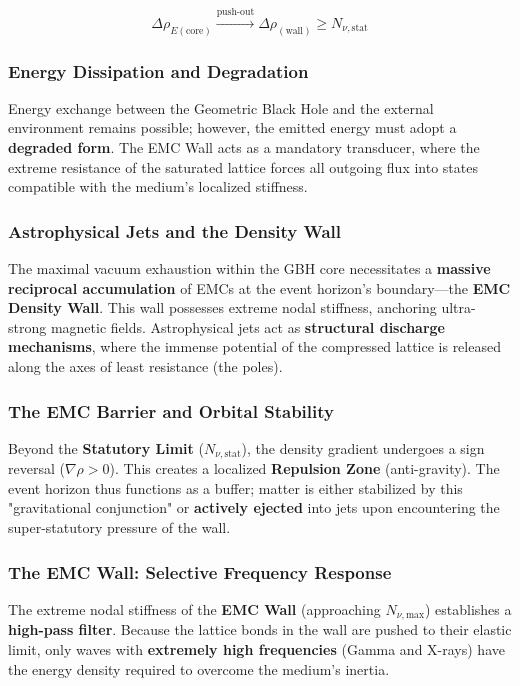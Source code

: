 \documentclass[10pt,a4paper]{article}
\begin{document}
\begin{equation}
	\Delta \rho_{E (\text{core})} \xrightarrow{\text{push-out}} \Delta \rho_{(\text{wall})} \ge N_{\nu, \text{stat}}
\end{equation}

\subsubsection*{Energy Dissipation and Degradation}
Energy exchange between the Geometric Black Hole and the external environment remains possible; however, the emitted energy must adopt a \textbf{degraded form}. The EMC Wall acts as a mandatory transducer, where the extreme resistance of the saturated lattice forces all outgoing flux into states compatible with the medium's localized stiffness.



\subsubsection*{Astrophysical Jets and the Density Wall}
The maximal vacuum exhaustion within the GBH core necessitates a \textbf{massive reciprocal accumulation} of EMCs at the event horizon’s boundary—the \textbf{EMC Density Wall}. This wall possesses extreme nodal stiffness, anchoring ultra-strong magnetic fields. Astrophysical jets act as \textbf{structural discharge mechanisms}, where the immense potential of the compressed lattice is released along the axes of least resistance (the poles).

\subsubsection*{The EMC Barrier and Orbital Stability}
Beyond the \textbf{Statutory Limit} ($N_{\nu, \text{stat}}$), the density gradient undergoes a sign reversal ($\nabla \rho > 0$). This creates a localized \textbf{Repulsion Zone} (anti-gravity). The event horizon thus functions as a buffer; matter is either stabilized by this "gravitational conjunction" or \textbf{actively ejected} into jets upon encountering the super-statutory pressure of the wall.

\subsubsection*{The EMC Wall: Selective Frequency Response}
The extreme nodal stiffness of the \textbf{EMC Wall} (approaching $N_{\nu, \text{max}}$) establishes a \textbf{high-pass filter}. Because the lattice bonds in the wall are pushed to their elastic limit, only waves with \textbf{extremely high frequencies} (Gamma and X-rays) have the energy density required to overcome the medium's inertia.
\end{document}
